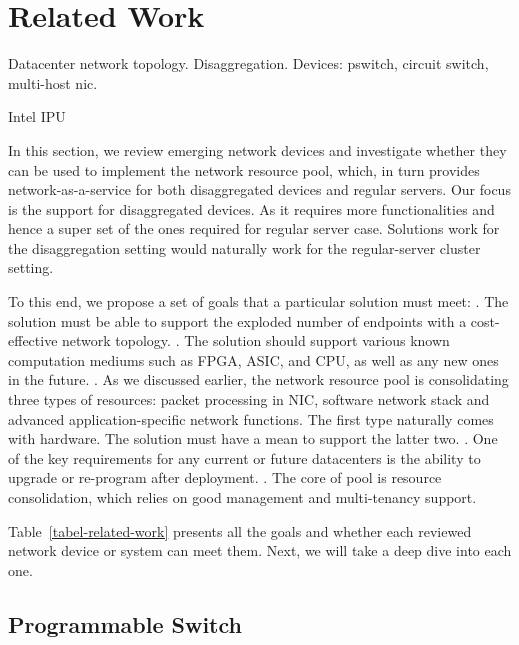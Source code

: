 
\section{Related Work}
\label{sec:related}


Datacenter network topology.
Disaggregation.
Devices: pswitch, circuit switch, multi-host nic.

Intel IPU










In this section, we review emerging network devices
and investigate whether they can be used to implement the
network resource pool, which, in turn provides network-as-a-service
for both disaggregated devices and regular servers.
Our focus is the support for disaggregated devices.
As it requires more functionalities and hence a super set of 
the ones required for regular server case.
Solutions work for the disaggregation setting would naturally
work for the regular-server cluster setting.

To this end, we propose a set of goals that a particular
solution must meet:
.
The solution must be able to
support the exploded number of endpoints with
a cost-effective network topology.
.
The solution should support various known computation mediums
such as FPGA, ASIC, and CPU, as well as any new ones in the future.
.
As we discussed earlier, the network resource pool is 
consolidating three types of resources: packet processing
in NIC, software network stack and advanced application-specific
network functions. The first type naturally comes with hardware.
The solution must have a mean to support the latter two.
.
One of the key requirements for any current or future datacenters
is the ability to upgrade or re-program after deployment.
.
The core of pool is resource consolidation,
which relies on good management and multi-tenancy support.

Table~\ref{tabel-related-work} presents all the goals
and whether each reviewed network device or system can meet them.
Next, we will take a deep dive into each one.


\subsection{Programmable Switch}

